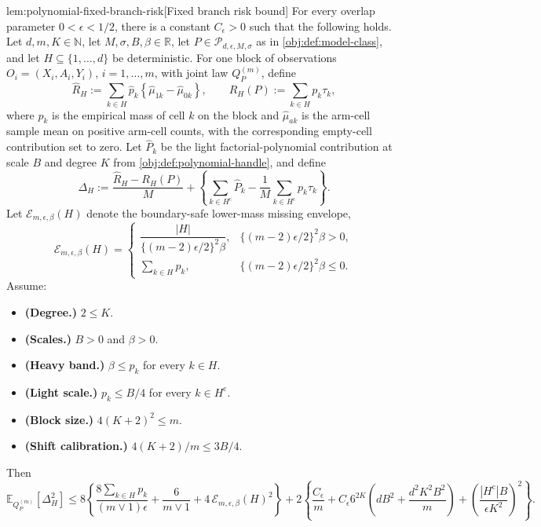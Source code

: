 \documentclass[11pt]{article}
\begin{document}
\begin{lemmav}{lem:polynomial-fixed-branch-risk}[Fixed branch risk bound]
For every overlap parameter \(0<\epsilon<1/2\), there is a constant \(C_{\epsilon}>0\) such that the following holds.  Let \(d,m,K\in\mathbb N\), let \(M,\sigma,B,\beta\in\mathbb R\), let \(P\in\mathcal P_{d,\epsilon,M,\sigma}\) as in \cref{obj:def:model-class}, and let \(H\subseteq\{1,\ldots,d\}\) be deterministic.  For one block of observations \(O_i=(X_i,A_i,Y_i)\), \(i=1,\ldots,m\), with joint law \(Q_P^{(m)}\), define
\[
\widehat R_H
:=
\sum_{k\in H}
\widehat p_k
\left\{
\widehat\mu_{1k}-\widehat\mu_{0k}
\right\},
\qquad
R_H(P)
:=
\sum_{k\in H}p_k\tau_k,
\]
where \(\widehat p_k\) is the empirical mass of cell \(k\) on the block and \(\widehat\mu_{ak}\) is the arm-cell sample mean on positive arm-cell counts, with the corresponding empty-cell contribution set to zero.  Let \(\widehat P_k\) be the light factorial-polynomial contribution at scale \(B\) and degree \(K\) from \cref{obj:def:polynomial-handle}, and define
\[
\Delta_H
:=
\frac{\widehat R_H-R_H(P)}{M}
+
\left\{
\sum_{k\in H^{\mathrm c}}\widehat P_k
-\frac{1}{M}\sum_{k\in H^{\mathrm c}}p_k\tau_k
\right\}.
\]
Let \(\mathcal E_{m,\epsilon,\beta}(H)\) denote the boundary-safe lower-mass missing envelope,
\[
\mathcal E_{m,\epsilon,\beta}(H)
=
\begin{cases}
\dfrac{|H|}{\{(m-2)\epsilon/2\}^2\beta},
& \{(m-2)\epsilon/2\}^2\beta>0,\\[1.2ex]
\sum_{k\in H}p_k,
& \{(m-2)\epsilon/2\}^2\beta\le 0.
\end{cases}
\]
Assume:
\begin{itemize}
\item \textbf{(Degree.)} \(2\le K\).
\item \textbf{(Scales.)} \(B>0\) and \(\beta>0\).
\item \textbf{(Heavy band.)} \(\beta\le p_k\) for every \(k\in H\).
\item \textbf{(Light scale.)} \(p_k\le B/4\) for every \(k\in H^{\mathrm c}\).
\item \textbf{(Block size.)} \(4(K+2)^2\le m\).
\item \textbf{(Shift calibration.)} \(4(K+2)/m\le 3B/4\).
\end{itemize}
Then
\[
\mathbb E_{Q_P^{(m)}}\!\left[\Delta_H^2\right]
\le
8\left\{
\frac{8\sum_{k\in H}p_k}{(m\vee 1)\epsilon}
+\frac{6}{m\vee 1}
+4\,\mathcal E_{m,\epsilon,\beta}(H)^2
\right\}
+
2\left\{
\frac{C_{\epsilon}}{m}
+C_{\epsilon}6^{2K}
\left(dB^2+\frac{d^2K^2B^2}{m}\right)
+\left(\frac{|H^{\mathrm c}|B}{\epsilon K^2}\right)^2
\right\}.
\]
\end{lemmav}
\end{document}
